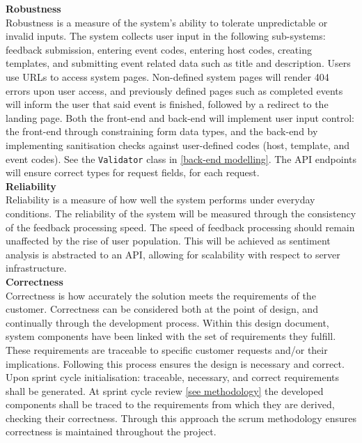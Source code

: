 \documentclass[9pt, titlepage]{extarticle}
\begin{document}
\textbf{Robustness}\\
Robustness is a measure of the system's ability to tolerate unpredictable or invalid inputs. 
The system collects user input in the following sub-systems: feedback submission, entering event codes, entering host codes, creating templates, and submitting event related data such as title and description. 
Users use URLs to access system pages. Non-defined system pages will render 404 errors upon user access, and previously defined pages such as completed events will inform the user that said event is finished, followed by a redirect to the landing page. Both the front-end and back-end will implement user input control: the front-end through constraining form data types, and the back-end by implementing sanitisation checks against user-defined codes (host, template, and event codes). See the \texttt{Validator} class in \hyperref[back-comp-model]{[back-end modelling]}. The API endpoints will ensure correct types for request fields, for each request. \\


\textbf{Reliability}\\
Reliability is a measure of how well the system performs under everyday conditions. The reliability of the system will be measured through the consistency of the feedback processing speed. The speed of feedback processing should remain unaffected by the rise of user population. This will be achieved as sentiment analysis is abstracted to an API, allowing for scalability with respect to server infrastructure. \\


\textbf{Correctness}\\
Correctness is how accurately the solution meets the requirements of the customer. Correctness can be considered both at the point of design, and continually through the development process. Within this design document, system components have been linked with the set of requirements they fulfill. These requirements are traceable to specific customer requests and/or their implications. Following this process ensures the design is necessary and correct.\\

Upon sprint cycle initialisation: traceable, necessary, and correct requirements shall be generated. At sprint cycle review \hyperref[methodology]{[see methodology]} the developed components shall be traced to the requirements from which they are derived, checking their correctness. Through this approach the scrum methodology ensures correctness is maintained throughout the project.\\ 
\end{document}
